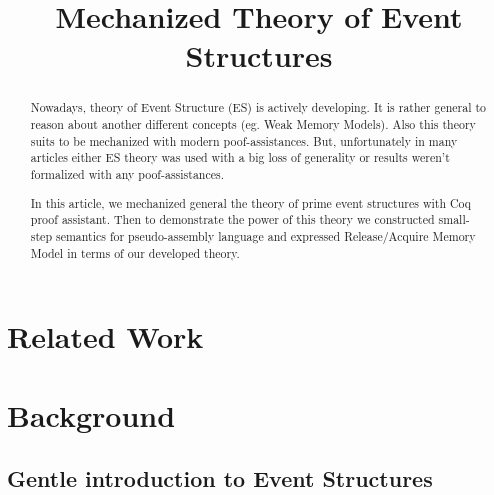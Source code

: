 \documentclass[conference]{IEEEtran}
\begin{document}
\title{Mechanized Theory of Event Structures}

\author{
\and
{}
\and
{}
\and
{}
}

\maketitle

\begin{abstract}


Nowadays, theory of Event Structure (ES) is actively developing. It is rather general to reason about another different  concepts (eg. Weak Memory Models). Also this theory suits to be mechanized with modern poof-assistances. But, unfortunately in many articles either ES theory was used with a big loss of generality or results weren't formalized with any poof-assistances.

In this article, we mechanized general the theory of prime event structures with Coq proof assistant. Then to demonstrate the power of this theory we constructed small-step semantics for pseudo-assembly language and expressed Release/Acquire Memory Model in terms of our developed theory.
\end{abstract}

\IEEEpeerreviewmaketitle



\section{Related Work}


\section{Background}

\subsection{Gentle introduction to Event Structures}
\end{document}
